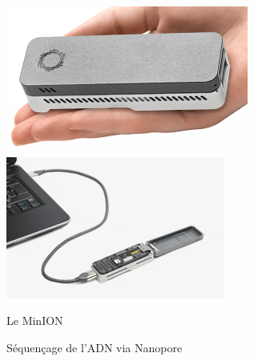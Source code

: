 \documentclass[a4paper]{article}
\begin{document}
\begin{figure}[!h]
\includegraphics[scale=0.75]{Nanoport} \hfill
\includegraphics[scale=0.75]{Nanoport2}
\caption{Le MinION \label{minion}}
\end{figure}

\begin{figure}[!h]
\caption{Séquençage de l'ADN via Nanopore\label{nano}}
\end{figure}
\end{document}
